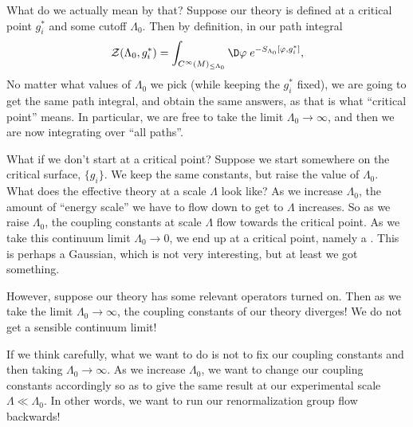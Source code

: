 \documentclass[a4paper]{article}
\begin{document}
What do we actually mean by that? Suppose our theory is defined at a critical point $g_i^*$ and some cutoff $\Lambda_0$. Then by definition, in our path integral
\[
  \mathcal{Z}(\Lambda_0, g_i^*) = \int_{C^\infty(M)_{\leq \Lambda_0}} \D \varphi\;e^{-S_{\Lambda_0}[\varphi, g_i^*]},
\]
No matter what values of $\Lambda_0$ we pick (while keeping the $g_i^*$ fixed), we are going to get the same path integral, and obtain the same answers, as that is what ``critical point'' means. In particular, we are free to take the limit $\Lambda_0 \to \infty$, and then we are now integrating over ``all paths''.

What if we don't start at a critical point? Suppose we start somewhere on the critical surface, $\{g_i\}$. We keep the same constants, but raise the value of $\Lambda_0$. What does the effective theory at a scale $\Lambda$ look like? As we increase $\Lambda_0$, the amount of ``energy scale'' we have to flow down to get to $\Lambda$ increases. So as we raise $\Lambda_0$, the coupling constants at scale $\Lambda$ flow towards the critical point. As we take this continuum limit $\Lambda_0 \to 0$, we end up at a critical point, namely a . This is perhaps a Gaussian, which is not very interesting, but at least we got something.

However, suppose our theory has some relevant operators turned on. Then as we take the limit $\Lambda_0 \to \infty$, the coupling constants of our theory diverges! We do not get a sensible continuum limit!

If we think carefully, what we want to do is not to fix our coupling constants and then taking $\Lambda_0 \to \infty$. As we increase $\Lambda_0$, we want to change our coupling constants accordingly so as to give the same result at our experimental scale $\Lambda \ll \Lambda_0$. In other words, we want to run our renormalization group flow backwards!
%
%
\end{document}

